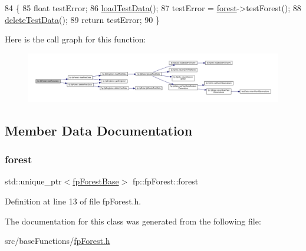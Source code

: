 \begin{DoxyCode}
84                                 \{
85                 \textcolor{keywordtype}{float} testError;
86                 \hyperlink{classfp_1_1fpForest_abdcf008b65b6af7be5428d838b33be32}{loadTestData}();
87                 testError = \hyperlink{classfp_1_1fpForest_a4ce6af867d36c8d62c860db8982235c4}{forest}->testForest();
88                 \hyperlink{classfp_1_1fpForest_a3eb78e4e61b289853cc45021f2cf3de0}{deleteTestData}();
89                 \textcolor{keywordflow}{return} testError;
90             \}
\end{DoxyCode}
Here is the call graph for this function\+:\nopagebreak
\begin{figure}[H]
\begin{center}
\leavevmode
\includegraphics[width=350pt]{classfp_1_1fpForest_a2ecaa11b48f37781f5fb4607ed6a490f_cgraph}
\end{center}
\end{figure}


\subsection{Member Data Documentation}
\mbox{\label{classfp_1_1fpForest_a4ce6af867d36c8d62c860db8982235c4}} 
\subsubsection{\texorpdfstring{forest}{forest}}
{\footnotesize\ttfamily std\+::unique\+\_\+ptr$<$\hyperlink{classfp_1_1fpForestBase}{fp\+Forest\+Base}$>$ fp\+::fp\+Forest\+::forest\hspace{0.3cm}{\ttfamily [protected]}}



Definition at line 13 of file fp\+Forest.\+h.



The documentation for this class was generated from the following file\+:\begin{DoxyCompactItemize}
\item 
src/base\+Functions/\hyperlink{fpForest_8h}{fp\+Forest.\+h}\end{DoxyCompactItemize}
